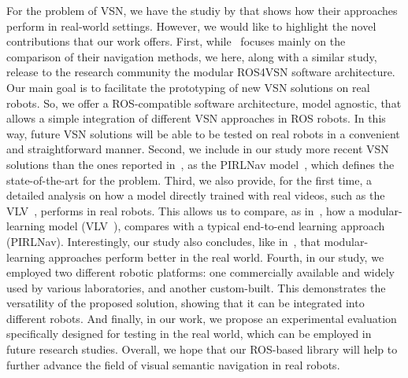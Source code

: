 For the problem of VSN, we have the studiy by \cite{gervet2022} that shows how their approaches perform in real-world settings.
However, we would like to highlight the novel contributions that our work offers.
First, while~\cite{gervet2022} focuses mainly on the comparison of their navigation methods, we here, along with a similar study, release to the research community the modular ROS4VSN software architecture.
Our main goal is to facilitate the prototyping of new VSN solutions on real robots.
So, we offer a ROS-compatible software architecture, model agnostic, that allows a simple integration of different VSN approaches in ROS robots.
In this way, future VSN solutions will be able to be tested on real robots in a convenient and straightforward manner.
Second, we include in our study more recent VSN solutions than the ones reported in~\cite{gervet2022}, as the PIRLNav model~\cite{ramrakhya2023}, which defines the state-of-the-art for the \objnav problem.
Third, we also provide, for the first time, a detailed analysis on how a model directly trained with real videos, such as the VLV~\cite{chang2020}, performs in real robots.
This allows us to compare, as in~\cite{gervet2022}, how a modular-learning model (\ie VLV~\cite{chang2020}), compares with a typical end-to-end learning approach (\ie PIRLNav).
Interestingly, our study also concludes, like in~\cite{gervet2022}, that modular-learning approaches perform better in the real world.
Fourth, in our study, we employed two different robotic platforms: one commercially available and widely used by various laboratories, and another custom-built.
This demonstrates the versatility of the proposed solution, showing that it can be integrated into different robots.
And finally, in our work, we propose an experimental evaluation specifically designed for testing in the real world, which can be employed in future research studies.
Overall, we hope that our ROS-based library will help to further advance the field of visual semantic navigation in real robots.